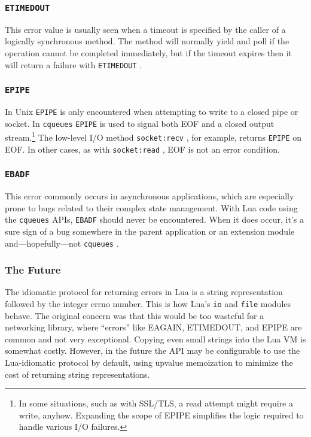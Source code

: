 \documentclass[11pt, oneside]{memoir}
\newcommand{\cqueues}[0]{\texttt{cqueues} }
\newcommand{\fn}[1]{\texttt{#1} }
\newcommand{\method}[1]{\texttt{#1} }
\newcommand{\errno}[1]{\texttt{#1} }
\begin{document}
\subsubsection{\texttt{ETIMEDOUT}}

This error value is usually seen when a timeout is specified by the caller of a logically synchronous method. The method will normally yield and poll if the operation cannot be completed immediately, but if the timeout expires then it will return a failure with \errno{ETIMEDOUT}.

\subsubsection{\texttt{EPIPE}}

In Unix \errno{EPIPE} is only encountered when attempting to write to a closed pipe or socket. In \cqueues \errno{EPIPE} is used to signal both EOF and a closed output stream.\footnote{In some situations, such as with SSL/TLS, a read attempt might require a write, anyhow. Expanding the scope of EPIPE simplifies the logic required to handle various I/O failures.} The low-level I/O method \method{socket:recv}, for example, returns \errno{EPIPE} on EOF. In other cases, as with \method{socket:read}, EOF is not an error condition.

\subsubsection{\texttt{EBADF}}

This error commonly occurs in asynchronous applications, which are especially prone to bugs related to their complex state management. With Lua code using the \cqueues APIs, \errno{EBADF} should never be encountered. When it does occur, it's a sure sign of a bug somewhere in the parent application or an extension module and---hopefully---not \cqueues.

\subsubsection{The Future}

The idiomatic protocol for returning errors in Lua is a string representation followed by the integer errno number. This is how Lua's \fn{io} and \fn{file} modules behave. The original concern was that this would be too wasteful for a networking library, where ``errors'' like EAGAIN, ETIMEDOUT, and EPIPE are common and not very exceptional. Copying even small strings into the Lua VM is somewhat costly. However, in the future the API may be configurable to use the Lua-idiomatic protocol by default, using upvalue memoization to minimize the cost of returning string representations.
\end{document}
